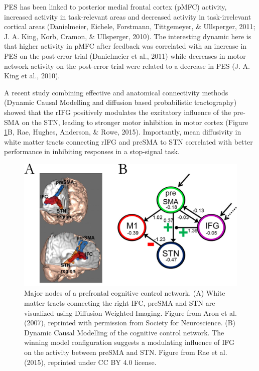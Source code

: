 \documentclass[12pt,openany]{book}
\theoremstyle{definition}
\theoremstyle{definition}
\theoremstyle{definition}
\theoremstyle{remark}
\begin{document}
PES has been linked to posterior medial frontal cortex (pMFC) activity,
increased activity in task-relevant areas and decreased activity in
task-irrelevant cortical areas (Danielmeier, Eichele, Forstmann,
Tittgemeyer, \& Ullsperger, 2011; J. A. King, Korb, Cramon, \&
Ullsperger, 2010). The interesting dynamic here is that higher activity
in pMFC after feedback was correlated with an increase in PES on the
post-error trial (Danielmeier et al., 2011) while decreases in motor
network activity on the post-error trial were related to a decrease in
PES (J. A. King et al., 2010).

A recent study combining effective and anatomical connectivity methods
(Dynamic Causal Modelling and diffusion based probabilistic
tractography) showed that the rIFG positively modulates the excitatory
influence of the pre-SMA on the STN, leading to stronger motor
inhibition in motor cortex (Figure \ref{fig_rifg_dcm}B, Rae, Hughes,
Anderson, \& Rowe, 2015). Importantly, mean diffusivity in white matter
tracts connecting rIFG and preSMA to STN correlated with better
performance in inhibiting responses in a stop-signal task.

\begin{figure}
\centering
\includegraphics{./figures/dcm.png}
\caption{Major nodes of a prefrontal cognitive control network. (A)
White matter tracts connecting the right IFC, preSMA and STN are
visualized using Diffusion Weighted Imaging. Figure from Aron et al.
(2007), reprinted with permission from Society for Neuroscience. (B)
Dynamic Causal Modelling of the cognitive control network. The winning
model configuration suggests a modulating influence of IFG on the
activity between preSMA and STN. Figure from Rae et al. (2015),
reprinted under CC BY 4.0 license.\label{fig_rifg_dcm}}
\end{figure}
\end{document}
